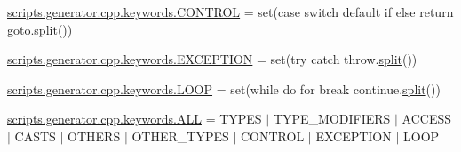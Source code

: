 \begin{DoxyCompactItemize}
\item 
\mbox{\hyperlink{namespacescripts_1_1generator_1_1cpp_1_1keywords_a2eca60fcf1373e784dd078ffc1d3f3dd}{scripts.\+generator.\+cpp.\+keywords.\+C\+O\+N\+T\+R\+OL}} = set(\textquotesingle{}case switch default if else return goto\textquotesingle{}.\mbox{\hyperlink{_input_8h_aec2fd8cd9140a1b535dc54a924396f40}{split}}())
\item 
\mbox{\hyperlink{namespacescripts_1_1generator_1_1cpp_1_1keywords_ab19f6c0a77878296a28917b714e91e13}{scripts.\+generator.\+cpp.\+keywords.\+E\+X\+C\+E\+P\+T\+I\+ON}} = set(\textquotesingle{}try catch throw\textquotesingle{}.\mbox{\hyperlink{_input_8h_aec2fd8cd9140a1b535dc54a924396f40}{split}}())
\item 
\mbox{\hyperlink{namespacescripts_1_1generator_1_1cpp_1_1keywords_abe5f4cb254098f501e0866818e8f1d6d}{scripts.\+generator.\+cpp.\+keywords.\+L\+O\+OP}} = set(\textquotesingle{}while do for break continue\textquotesingle{}.\mbox{\hyperlink{_input_8h_aec2fd8cd9140a1b535dc54a924396f40}{split}}())
\item 
\mbox{\hyperlink{namespacescripts_1_1generator_1_1cpp_1_1keywords_aecbcf29b0a97bc5f87f173cad5554620}{scripts.\+generator.\+cpp.\+keywords.\+A\+LL}} = T\+Y\+P\+ES $\vert$ T\+Y\+P\+E\+\_\+\+M\+O\+D\+I\+F\+I\+E\+RS $\vert$ A\+C\+C\+E\+SS $\vert$ C\+A\+S\+TS $\vert$ O\+T\+H\+E\+RS $\vert$ O\+T\+H\+E\+R\+\_\+\+T\+Y\+P\+ES $\vert$ C\+O\+N\+T\+R\+OL $\vert$ E\+X\+C\+E\+P\+T\+I\+ON $\vert$ L\+O\+OP
\end{DoxyCompactItemize}
